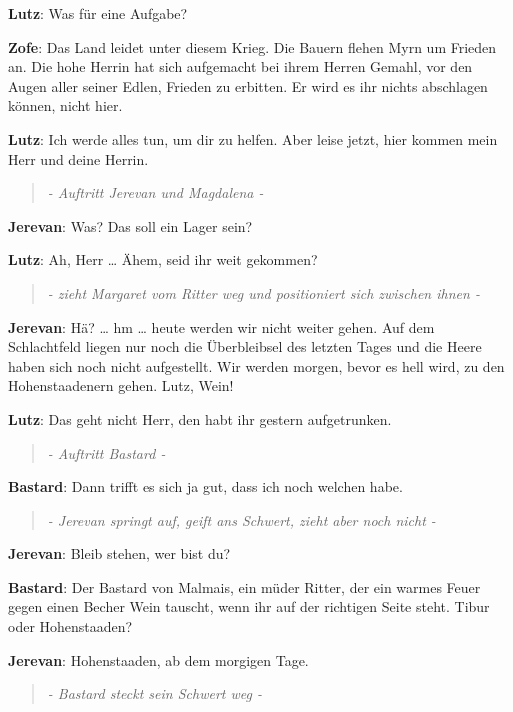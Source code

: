 \documentclass[a5paper,6pt]{book}
\begin{document}
\textbf{Lutz}: Was für eine Aufgabe?

\textbf{Zofe}: Das Land leidet unter diesem Krieg. Die Bauern flehen Myrn um Frieden an. Die hohe Herrin hat sich aufgemacht bei ihrem Herren Gemahl, vor den Augen aller seiner Edlen, Frieden zu erbitten. Er wird es ihr nichts abschlagen können, nicht hier.

\textbf{Lutz}: Ich werde alles tun, um dir zu helfen. Aber leise jetzt, hier kommen mein Herr und deine Herrin.

\begin{quote}
  \textit{- Auftritt Jerevan und Magdalena -}
 \end{quote}


\textbf{Jerevan}: Was? Das soll ein Lager sein?

\textbf{Lutz}: Ah, Herr … Ähem, seid ihr weit gekommen?

\begin{quote}
  \textit{- zieht Margaret vom Ritter weg und positioniert sich zwischen ihnen -}
 \end{quote}

\textbf{Jerevan}: Hä? … hm … heute werden wir nicht weiter gehen. Auf dem Schlachtfeld liegen nur noch die Überbleibsel des letzten Tages und die Heere haben sich noch nicht aufgestellt. Wir werden morgen, bevor es hell wird, zu den Hohenstaadenern gehen.
Lutz, Wein!

\textbf{Lutz}: Das geht nicht Herr, den habt ihr gestern aufgetrunken.

\begin{quote}
  \textit{- Auftritt Bastard -}
 \end{quote}



\textbf{Bastard}: Dann trifft es sich ja gut, dass ich noch welchen habe.

\begin{quote}
  \textit{- Jerevan springt auf, geift ans Schwert, zieht aber noch nicht -}
 \end{quote}

\textbf{Jerevan}: Bleib stehen, wer bist du?

\textbf{Bastard}: Der Bastard von Malmais, ein müder Ritter, der ein warmes Feuer gegen einen Becher Wein tauscht, wenn ihr auf der richtigen Seite steht.
Tibur oder Hohenstaaden?

\textbf{Jerevan}: Hohenstaaden, ab dem morgigen Tage.


\begin{quote}
  \textit{- Bastard steckt sein Schwert weg -}
 \end{quote}
\end{document}
